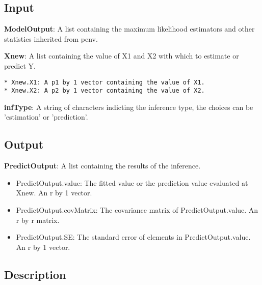 \documentclass[a4paper,11pt,openany]{memoir}
\begin{document}
\subsection*{Input}

\begin{par}
\textbf{ModelOutput}: A list containing the maximum likelihood estimators and other statistics inherited from penv.
\end{par} \vspace{1em}
\begin{par}
\textbf{Xnew}: A list containing the value of X1 and X2 with which to estimate or predict Y.
\end{par} \vspace{1em}

\begin{verbatim}* Xnew.X1: A p1 by 1 vector containing the value of X1.
* Xnew.X2: A p2 by 1 vector containing the value of X2.\end{verbatim}
    \begin{par}
\textbf{infType}: A string of characters indicting the inference type, the choices can be 'estimation' or 'prediction'.
\end{par} \vspace{1em}


\subsection*{Output}

\begin{par}
\textbf{PredictOutput}: A list containing the results of the inference.
\end{par} \vspace{1em}
\begin{itemize}
\setlength{\itemsep}{-1ex}
   \item PredictOutput.value: The fitted value or the prediction value evaluated at Xnew. An r by 1 vector.
   \item PredictOutput.covMatrix: The covariance matrix of PredictOutput.value. An r by r matrix.
   \item PredictOutput.SE: The standard error of elements in PredictOutput.value. An r by 1 vector.
\end{itemize}


\subsection*{Description}
\end{document}
